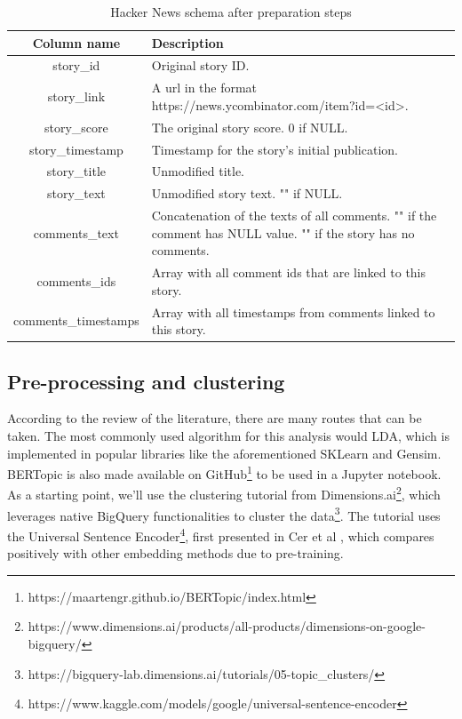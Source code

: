 \documentclass[nonacm,sigconf]{acmart}
\begin{document}
\begin{table}[htbp]
  \caption{Hacker News schema after preparation steps}
  \label{tab:cleaned}
  \begin{tabular}{cl}
    Column name&Description\\
    \hline
    story\_id & Original story ID. \\
    story\_link & A url in the format https://news.ycombinator.com/item?id=<id>. \\
    story\_score & The original story score. 0 if NULL. \\
    story\_timestamp & Timestamp for the story's initial publication. \\
    story\_title & Unmodified title. \\
    story\_text & Unmodified story text. "" if NULL. \\
    comments\_text & Concatenation of the texts of all comments. "" if the comment has NULL value. "" if the story has no comments. \\
    comments\_ids & Array with all comment ids that are linked to this story. \\
    comments\_timestamps & Array with all timestamps from comments linked to this story. \\
\end{tabular}
\end{table}

\subsection{Pre-processing and clustering}

According to the review of the literature, there are many routes that can be taken. The most commonly used algorithm for this analysis would LDA, which is implemented in popular libraries like the aforementioned SKLearn and Gensim. BERTopic is also made available on GitHub\footnote{https://maartengr.github.io/BERTopic/index.html} to be used in a Jupyter notebook. As a starting point, we'll use the clustering tutorial from Dimensions.ai\footnote{https://www.dimensions.ai/products/all-products/dimensions-on-google-bigquery/}, which leverages native BigQuery functionalities to cluster the data\footnote{https://bigquery-lab.dimensions.ai/tutorials/05-topic\_clusters/}. The tutorial uses the Universal Sentence Encoder\footnote{https://www.kaggle.com/models/google/universal-sentence-encoder}, first presented in Cer et al \cite{DBLP:journals/corr/abs-1803-11175}, which compares positively with other embedding methods due to pre-training.
\end{document}
